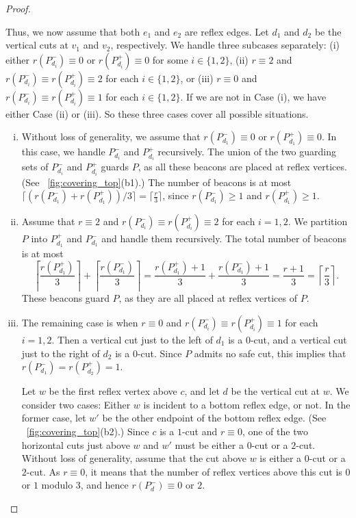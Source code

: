 \documentclass[11pt]{article}
\theoremstyle{definition}
\let\geq\geqslant
\begin{document}
\begin{proof}
\begin{enumerate}[(a)]
 Thus, we now assume that both $e_1$ and $e_2$ are reflex edges.
 Let $d_1$ and $d_2$ be the vertical cuts at $v_1$ and $v_2$, respectively.
We handle three subcases separately:
 (i) either $r(P^-_{d_i}) \equiv 0$ or $r(P^+_{d_i}) \equiv 0$ for some $i\in \{1,2\}$,
 (ii) $r \equiv 2$ and $r(P^-_{d_i}) \equiv r(P^+_{d_i}) \equiv 2$ for each $i \in \{1,2\}$,
 or (iii) $r\equiv 0$ and $r(P^-_{d_i}) \equiv r(P^+_{d_i}) \equiv 1$ for each $i \in \{1,2\}$.
 If we are not in Case (i), we have either Case (ii) or (iii).
 So these three cases cover all possible situations.
 \begin{enumerate}[(i)]
 \item Without loss of generality, we assume that $r(P^-_{d_1}) \equiv 0$ or $r(P^+_{d_1}) \equiv 0$.
 In this case,  we handle $P^-_{d_i}$ and $P^+_{d_i}$ recursively.
 The union of the two guarding sets of $P^-_{d_i}$ and $P^+_{d_i}$ guards $P$,
 as all these beacons are placed at reflex vertices.
 (See \figurename~\ref{fig:covering_top}(b1).)
 The number of  beacons is at most  $\lceil (r(P^-_{d_1})+r(P^+_{d_1}))/3 \rceil
 = \lceil \frac{r}{3} \rceil$,
 since $r(P^-_{d_1}) \geq 1$ and $r(P^+_{d_1}) \geq 1$.


 \item Assume that $r \equiv 2$ and $r(P^-_{d_i}) \equiv r(P^+_{d_i}) \equiv 2$ for each $i=1,2$.
 We partition $P$ into $P^+_{d_1}$ and $P^-_{d_1}$ and handle them recursively.
 The total number of beacons is at most
 \[\left\lceil \frac{ r(P^+_{d_1})}{3} \right\rceil + \left\lceil \frac{r(P^-_{d_1})}{3} \right\rceil
   = \frac{r(P^+_{d_1})+1}{3} + \frac{r(P^-_{d_1})+1}{3} = \frac{r + 1}{3} =
   \left\lceil \frac{r}{3} \right\rceil.\]
 These beacons guard $P$, as they are all placed at reflex vertices of $P$.
 \item
 The remaining case is when $r \equiv 0$ and $r(P^-_{d_i}) \equiv r(P^+_{d_i}) \equiv 1$
 for each $i=1, 2$.
 Then a vertical cut just to the left of $d_1$ is a $0$-cut,
 and a vertical cut just to the right of $d_2$ is a $0$-cut.
 Since $P$ admits no safe cut, this implies that $r(P^-_{d_1}) = r(P^+_{d_2}) = 1$.

 Let $w$ be the first reflex vertex above $c$, and let $d$ be the vertical cut at $w$.
 We consider two cases: Either $w$ is incident to a bottom reflex edge, or not.
 In the former case, let $w'$ be the other endpoint of the bottom reflex edge.
 (See \figurename~\ref{fig:covering_top}(b2).)
 Since $c$ is a $1$-cut and $r\equiv 0$, one of the two horizontal cuts just above $w$ and $w'$
 must be either a $0$-cut or a $2$-cut.
 Without loss of generality, assume that the cut above $w$ is  either a $0$-cut or a $2$-cut.
 As $r \equiv 0$, it means that the number of reflex vertices above this cut is $0$ or $1$
 modulo 3, and hence $r(P_d^-) \equiv 0$ or $2$.
 


\end{enumerate}
\end{enumerate}
\end{proof}
\end{document}
